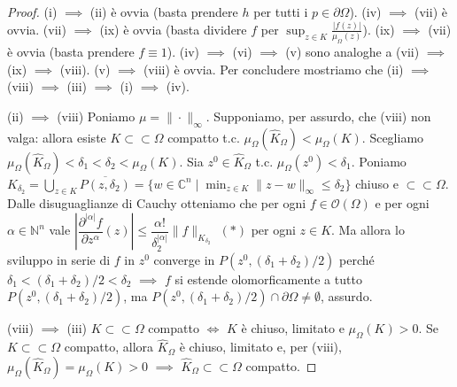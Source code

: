 \begin{proof}
  (i) $\implies$ (ii) è ovvia (basta prendere $h$ per tutti i $p \in \partial\Omega$). (iv) $\implies$ (vii) è ovvia. (vii) $\implies$ (ix) è ovvia (basta dividere $f$ per $\displaystyle \sup_{z \in K} \frac{|f(z)|}{\mu_\Omega(z)}$). (ix) $\implies$ (vii) è ovvia (basta prendere $f \equiv 1$). (iv) $\implies$ (vi) $\implies$ (v) sono analoghe a (vii) $\implies$ (ix) $\implies$ (viii).
  (v) $\implies$ (viii) è ovvia. Per concludere mostriamo che (ii) $\implies$ (viii) $\implies$ (iii) $\implies$ (i) $\implies$ (iv).

  (ii) $\implies$ (viii) Poniamo $\mu=\|\cdot\|_{\infty}$. Supponiamo, per assurdo, che (viii) non valga: allora esiste $K \subset\subset \Omega$ compatto t.c. $\mu_{\Omega}(\hat{K}_\Omega)<\mu_\Omega(K)$. Scegliamo $\mu_\Omega(\hat{K}_\Omega)< \delta_1<\delta_2<\mu_\Omega(K)$.
  Sia $z^0 \in \hat{K}_\Omega$ t.c. $\mu_\Omega(z^0)<\delta_1$.
  Poniamo $\displaystyle K_{\delta_2}=\bigcup_{z \in K} \overline{P(z, \delta_2)}=\{w \in \mathbb{C}^n \mid \min_{z \in K} \|z-w\|_\infty \le \delta_2\}$ chiuso e $\subset\subset \Omega$.
  Dalle disuguaglianze di Cauchy otteniamo che per ogni $f \in \mathcal{O}(\Omega)$ e per ogni $\alpha \in \mathbb{N}^n$ vale $\left|\dfrac{\partial^{|\alpha|}f}{\partial z^\alpha}(z)\right| \le \dfrac{\alpha!}{\delta_2^{|\alpha|}}\|f\|_{K_{\delta_2}}$ $(*)$ per ogni $z \in K$.
  Ma allora lo sviluppo in serie di $f$ in $z^0$ converge in $P(z^0, (\delta_1+\delta_2)/2)$ perché $\delta_1<(\delta_1+\delta_2)/2<\delta_2$ $\implies$ $f$ si estende olomorficamente a tutto $P(z^0, (\delta_1+\delta_2)/2)$, ma $P(z^0, (\delta_1+\delta_2)/2) \cap \partial\Omega\not=\emptyset$, assurdo.

  (viii) $\implies$ (iii) $K \subset\subset \Omega$ compatto $\iff$ $K$ è chiuso, limitato e $\mu_\Omega(K)>0$. Se $K \subset\subset \Omega$ compatto, allora $\hat{K}_\Omega$ è chiuso, limitato e, per (viii), $\mu_\Omega(\hat{K}_\Omega)=\mu_\Omega(K)>0$ $\implies$ $\hat{K}_\Omega \subset\subset \Omega$ compatto.


\end{proof}
